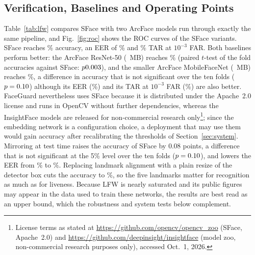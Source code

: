 \documentclass[journal]{IEEEtran}
\newcommand{\sys}{FaceGuard}
\begin{document}
\subsection{Verification, Baselines and Operating Points}
Table~\ref{tab:lfw} compares SFace with two ArcFace models run through exactly the same pipeline, and Fig.~\ref{fig:roc} shows the ROC curves of the SFace variants. SFace reaches \lfwAccFull\% accuracy, an EER of \lfwEerFull\% and \lfwTarThreeFull\% TAR at $10^{-3}$ FAR. Both baselines perform better: the ArcFace ResNet-50 (\baseRfiftyMb~MB) reaches \baseRfiftyAcc\% (paired $t$-test of the fold accuracies against SFace: $p0.003$), and the smaller ArcFace MobileFaceNet (\baseMbfMb~MB) reaches \baseMbfAcc\%, a difference in accuracy that is not significant over the ten folds ($p=0.10$) although its EER (\baseMbfEer\%) and its TAR at $10^{-3}$ FAR (\baseMbfTarThree\%) are also better. \sys{} nevertheless uses SFace because it is distributed under the Apache~2.0 license and runs in OpenCV without further dependencies, whereas the InsightFace models are released for non-commercial research only\footnote{License terms as stated at \url{https://github.com/opencv/opencv_zoo} (SFace, Apache~2.0) and \url{https://github.com/deepinsight/insightface} (model zoo, non-commercial research purposes only), accessed Oct.~1, 2026.}; since the embedding network is a configuration choice, a deployment that may use them would gain accuracy after recalibrating the thresholds of Section~\ref{sec:system}. Mirroring at test time raises the accuracy of SFace by 0.08 points, a difference that is not significant at the 5\% level over the ten folds ($p=0.10$), and lowers the EER from \lfwEerNoTTA\% to \lfwEerFull\%. Replacing landmark alignment with a plain resize of the detector box cuts the accuracy to \lfwAccNoAlign\%, so the five landmarks matter for recognition as much as for liveness. Because LFW is nearly saturated and its public figures may appear in the data used to train these networks, the results are best read as an upper bound, which the robustness and system tests below complement.
\end{document}
